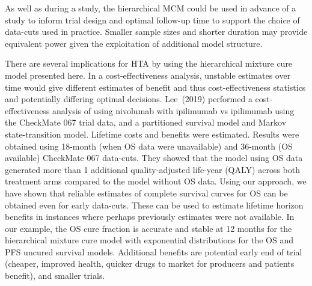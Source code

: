 \documentclass[AMA,STIX1COL]{WileyNJD-v2}
\begin{document}
As well as during a study, the hierarchical MCM could be used in advance of a study to inform trial design and optimal follow-up time to support the choice of data-cuts used in practice. Smaller sample sizes and shorter duration may provide equivalent power given the exploitation of additional model structure.

There are several implications for HTA by using the hierarchical mixture cure model presented here.
In a cost-effectiveness analysis, unstable estimates over time would give different estimates of benefit and thus cost-effectiveness statistics and potentially differing optimal decisions.
Lee~(2019)\cite{Lee2019} performed a cost-effectiveness analysis of using nivolumab with ipilimumab vs ipilimumab using the CheckMate 067 trial data, and a partitioned survival model and Markov state-transition model. Lifetime costs and benefits were estimated.
Results were obtained using 18-month (when OS data were unavailable) and 36-month (OS available) CheckMate 067 data-cuts. They showed that the model using OS data generated more than 1 additional quality-adjusted life-year (QALY) across both treatment arms compared to the model without OS data.
Using our approach, we have shown that reliable estimates of complete survival curves for OS can be obtained even for early data-cuts. These can be used to estimate lifetime horizon benefits in instances where perhaps previously estimates were not available.
In our example, the OS cure fraction is accurate and stable at 12 months for the hierarchical mixture cure model with exponential distributions for the OS and PFS uncured survival models.
Additional benefits are potential early end of trial (cheaper, improved health, quicker drugs to market for producers and patients benefit), and smaller trials.


\end{document}
